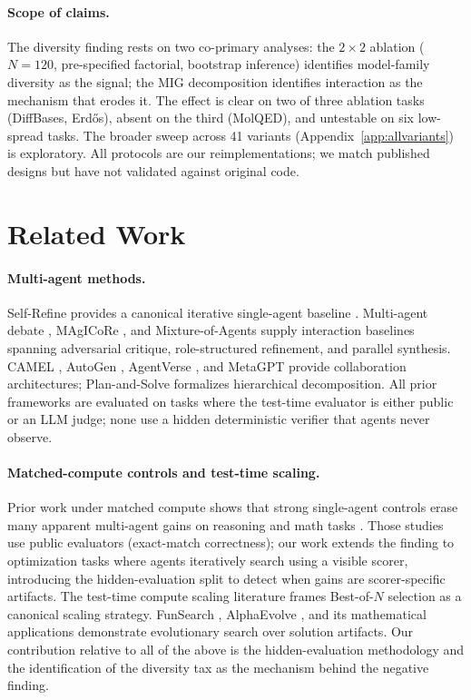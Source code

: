 \documentclass{article}
\begin{document}
\paragraph{Scope of claims.}
The diversity finding rests on two co-primary analyses: the $2{\times}2$ ablation ($N{=}120$, pre-specified factorial, bootstrap inference) identifies model-family diversity as the signal; the MIG decomposition identifies interaction as the mechanism that erodes it. The effect is clear on two of three ablation tasks (DiffBases, Erd\H{o}s), absent on the third (MolQED), and untestable on six low-spread tasks. The broader sweep across 41 variants (Appendix~\ref{app:allvariants}) is exploratory. All protocols are our reimplementations; we match published designs but have not validated against original code.

\section{Related Work}
\label{sec:related}

\paragraph{Multi-agent methods.}
Self-Refine provides a canonical iterative single-agent baseline \citep{madaan2023selfrefine}. Multi-agent debate \citep{du2024debate}, MAgICoRe \citep{chen2025magicore}, and Mixture-of-Agents \citep{wang2025moa} supply interaction baselines spanning adversarial critique, role-structured refinement, and parallel synthesis. CAMEL \citep{li2023camel}, AutoGen \citep{wu2023autogen}, AgentVerse \citep{chen2023agentverse}, and MetaGPT \citep{hong2023metagpt} provide collaboration architectures; Plan-and-Solve \citep{wang2023plansolve} formalizes hierarchical decomposition. All prior frameworks are evaluated on tasks where the test-time evaluator is either public or an LLM judge; none use a hidden deterministic verifier that agents never observe.

\paragraph{Matched-compute controls and test-time scaling.}
Prior work under matched compute shows that strong single-agent controls erase many apparent multi-agent gains on reasoning and math tasks \citep{xu2026single,tran2026equal}. Those studies use public evaluators (exact-match correctness); our work extends the finding to optimization tasks where agents iteratively search using a visible scorer, introducing the hidden-evaluation split to detect when gains are scorer-specific artifacts. The test-time compute scaling literature \citep{snell2024scaling} frames Best-of-$N$ selection as a canonical scaling strategy. FunSearch \citep{romeraparedes2024funsearch}, AlphaEvolve \citep{novikov2025alphaevolve}, and its mathematical applications \citep{georgiev2025alphaevolve} demonstrate evolutionary search over solution artifacts. Our contribution relative to all of the above is the hidden-evaluation methodology and the identification of the diversity tax as the mechanism behind the negative finding.
\end{document}
